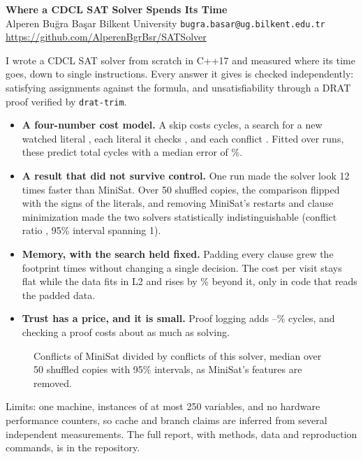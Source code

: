 \documentclass[11pt,a4paper]{article}
\begin{document}
\begin{center}
{\Large\bfseries Where a CDCL SAT Solver Spends Its Time}\\[4pt]
Alperen Buğra Başar \quad\textbullet\quad Bilkent University
\quad\textbullet\quad \texttt{bugra.basar@ug.bilkent.edu.tr}\\
\url{https://github.com/AlperenBgrBsr/SATSolver}
\end{center}

I wrote a CDCL SAT solver from scratch in C++17 and measured where its time
goes, down to single instructions. Every answer it gives is checked
independently: satisfying assignments against the formula, and
unsatisfiability through a DRAT proof verified by \texttt{drat-trim}.

\begin{itemize}[leftmargin=*, itemsep=3pt]
  \item \textbf{A four-number cost model.} A skip costs \numCoefSkip{} cycles,
        a search for a new watched literal \numCoefSearch{}, each literal it
        checks \numCoefScan{}, and each conflict \numCoefConflict{}. Fitted
        over \numModelRuns{} runs, these predict total cycles with a median
        error of \numModelMedianErr\%.
  \item \textbf{A result that did not survive control.} One run made the
        solver look 12 times faster than MiniSat. Over 50 shuffled copies,
        the comparison flipped with the signs of the literals, and removing
        MiniSat's restarts and clause minimization made the two solvers
        statistically indistinguishable (conflict ratio
        \numGapNoflipNoRestartNoMin, 95\% interval spanning 1).
  \item \textbf{Memory, with the search held fixed.} Padding every clause grew
        the footprint \numPadFootprint{} times without changing a single
        decision. The cost per visit stays flat while the data fits in L2 and
        rises by \numPadSlowdown\% beyond it, only in code that reads the
        padded data.
  \item \textbf{Trust has a price, and it is small.} Proof logging adds
        \numProofOverheadMin--\numProofOverheadMax\% cycles, and checking a
        proof costs about as much as solving.
\end{itemize}

\begin{figure}[ht]
\centering
{}
\caption{Conflicts of MiniSat divided by conflicts of this solver, median over
50 shuffled copies with 95\% intervals, as MiniSat's features are removed.}
\end{figure}

\noindent Limits: one machine, instances of at most 250 variables, and no
hardware performance counters, so cache and branch claims are inferred from
several independent measurements. The full report, with methods, data and
reproduction commands, is in the repository.
\end{document}
